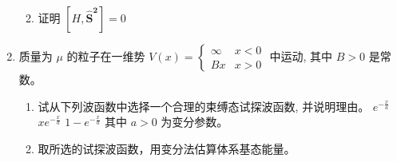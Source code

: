 \begin{enumerate}
\begin{enumerate}
\begin{enumerate}
		
		
	\end{enumerate}
	
	
\item 
证明 $\left[H, \hat{\boldsymbol{S}}^{\mathbf{2}}\right]=0$	
	
	
\end{enumerate}





\newpage
\item 
质量为 $\mu$ 的粒子在一维势 $V(x)=\left\{\begin{array}{ll}\infty & x<0 \\ B x & x>0\end{array}\right.$ 中运动, 其中 $B>0$ 是常数。
\begin{enumerate}
	\item
	试从下列波函数中选择一个合理的束缚态试探波函数, 并说明理由。
\threechoices
{$e^{-\frac{x}{a}}$}
{$x e^{-\frac{x}{a}}$}
{$1-e^{-\frac{x}{a}}$}
其中 $a>0$ 为变分参数。

\item 
取所选的试探波函数，用变分法估算体系基态能量。

	
	
	
\end{enumerate}



\end{enumerate}
